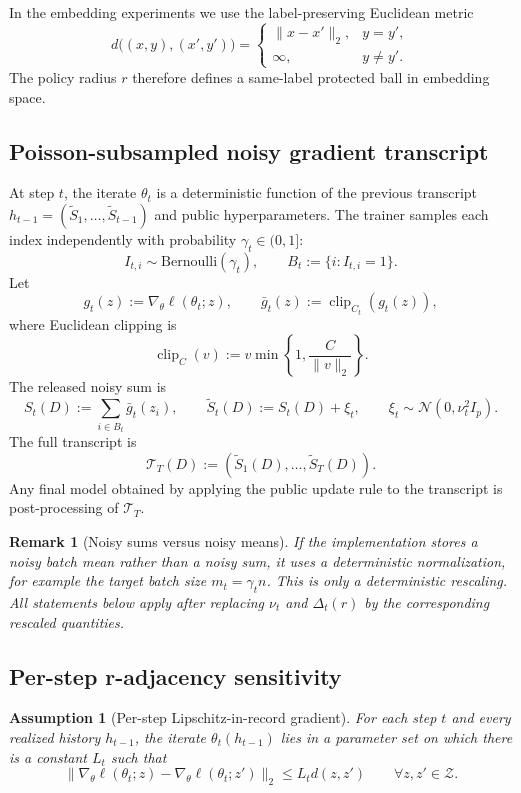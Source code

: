 \documentclass[conference,compsoc]{IEEEtran}
\newtheorem{assumption}{Assumption}
\newtheorem{remark}{Remark}
\DeclareMathOperator{\clip}{clip}
\newcommand{\N}{\mathcal{N}}
\newcommand{\cT}{\mathcal{T}}
\newcommand{\cZ}{\mathcal{Z}}
\begin{document}
In the embedding experiments we use the label-preserving Euclidean metric
\[
d\big((x,y),(x',y')\big)=
\begin{cases}
\|x-x'\|_2, & y=y',\\
\infty, & y\ne y'.
\end{cases}
\]
The policy radius $r$ therefore defines a same-label protected ball in embedding space.

\subsection{Poisson-subsampled noisy gradient transcript}

At step $t$, the iterate $\theta_t$ is a deterministic function of the previous transcript $h_{t-1}=(\widetilde S_1,\ldots,\widetilde S_{t-1})$ and public hyperparameters. The trainer samples each index independently with probability $\gamma_t\in(0,1]$:
\[
I_{t,i}\sim\mathrm{Bernoulli}(\gamma_t),
\qquad
B_t:=\{i:I_{t,i}=1\}.
\]
Let
\[
g_t(z):=\nabla_\theta \ell(\theta_t;z),
\qquad
\bar g_t(z):=\clip_{C_t}(g_t(z)),
\]
where Euclidean clipping is
\[
\clip_C(v):=v\min\left\{1,\frac{C}{\|v\|_2}\right\}.
\]
The released noisy sum is
\[
S_t(D):=\sum_{i\in B_t}\bar g_t(z_i),
\qquad
\widetilde S_t(D):=S_t(D)+\xi_t,
\qquad
\xi_t\sim\N(0,\nu_t^2 I_p).
\]
The full transcript is
\[
\cT_T(D):=(\widetilde S_1(D),\ldots,\widetilde S_T(D)).
\]
Any final model obtained by applying the public update rule to the transcript is post-processing of $\cT_T$.

\begin{remark}[Noisy sums versus noisy means]
If the implementation stores a noisy batch mean rather than a noisy sum, it uses a deterministic normalization, for example the target batch size $m_t=\gamma_t n$. This is only a deterministic rescaling. All statements below apply after replacing $\nu_t$ and $\Delta_t(r)$ by the corresponding rescaled quantities.
\end{remark}

\subsection{Per-step r-adjacency sensitivity}

\begin{assumption}[Per-step Lipschitz-in-record gradient]
\label{ass:step-lz}
For each step $t$ and every realized history $h_{t-1}$, the iterate $\theta_t(h_{t-1})$ lies in a parameter set on which there is a constant $L_t$ such that
\[
\|\nabla_\theta\ell(\theta_t;z)-\nabla_\theta\ell(\theta_t;z')\|_2
\le L_t d(z,z')
\qquad\forall z,z'\in\cZ.
\]
\end{assumption}
\end{document}
